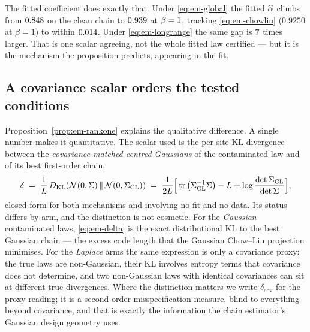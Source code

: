 The fitted coefficient does exactly that. Under \eqref{eq:em-global} the fitted
$\widehat{\alpha}$ climbs from $0.848$ on the clean chain to
$0.939$ at $\beta = 1$, tracking \eqref{eq:em-chowliu}
($0.9250$ at $\beta = 1$) to within $0.014$. Under
\eqref{eq:em-longrange} the same gap is $7$ times larger. That is
one scalar agreeing, not the whole fitted law certified --- but it is the
mechanism the proposition predicts, appearing in the fit.

\subsection{A covariance scalar orders the tested conditions}

Proposition~\ref{prop:em-rankone} explains the qualitative difference. A single
number makes it quantitative. The scalar used is the per-site KL divergence
between the \emph{covariance-matched centred Gaussians} of the contaminated
law and of its best first-order chain,
\begin{equation}
  \delta \;=\; \frac{1}{L}\,
  D_{\mathrm{KL}}\!\left(\mathcal{N}(0,\Sigma) \,\|\, \mathcal{N}(0,\Sigma_{\mathrm{CL}})\right)
  \;=\; \frac{1}{2L}\Big[
  \operatorname{tr}\big(\Sigma_{\mathrm{CL}}^{-1}\Sigma\big) - L
  + \log\frac{\det \Sigma_{\mathrm{CL}}}{\det \Sigma}\Big],
  \label{eq:em-delta}
\end{equation}
closed-form for both mechanisms and involving no fit and no data. Its status
differs by arm, and the distinction is not cosmetic. For the \emph{Gaussian}
contaminated laws, \eqref{eq:em-delta} is the exact distributional KL to the
best Gaussian chain --- the excess code length that the Gaussian Chow--Liu
projection minimises. For the \emph{Laplace} arms the same expression is only
a covariance proxy: the true laws are non-Gaussian, their KL involves entropy
terms that covariance does not determine, and two non-Gaussian laws with
identical covariances can sit at different true divergences. Where the
distinction matters we write $\delta_{\mathrm{cov}}$ for the proxy reading;
it is a second-order misspecification measure, blind to everything beyond
covariance, and that is exactly the information the chain estimator's Gaussian
design geometry uses.

